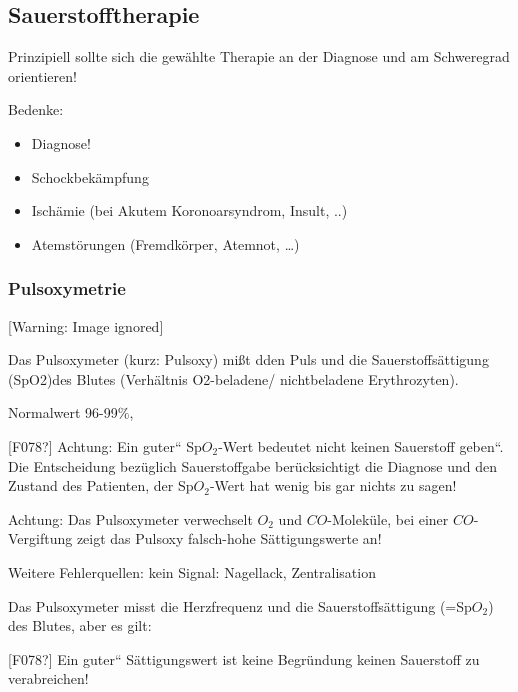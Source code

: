 \subsection{Sauerstofftherapie}
Prinzipiell sollte sich die gew\"ahlte Therapie an der Diagnose und am
Schweregrad orientieren!

Bedenke: 

\begin{itemize}
\item Diagnose!

\item Schockbek\"ampfung

\item Isch\"amie (bei Akutem Koronoarsyndrom, Insult, ..)

\item Atemst\"orungen (Fremdk\"orper, Atemnot, {\dots})

\end{itemize}

\subsubsection{Pulsoxymetrie}

\begin{center}
 [Warning: Image ignored] %

\end{center}
Das Pulsoxymeter (kurz: Pulsoxy) mi{\ss}t dden Puls und die
Sauerstoffs\"attigung (SpO2)des Blutes (Verh\"altnis
O2-beladene/ nichtbeladene Erythrozyten). 

Normalwert 96-99\%, 

[F078?] Achtung: Ein {\quotedblbase}guter{\textquotedblleft}
Sp$O_2$-Wert bedeutet nicht {\quotedblbase}keinen Sauerstoff
geben{\textquotedblleft}. Die Entscheidung bez\"uglich Sauerstoffgabe
ber\"ucksichtigt die Diagnose und den Zustand des Patienten, der
Sp$O_2$-Wert hat wenig bis gar nichts zu sagen! 

Achtung: Das Pulsoxymeter verwechselt $O_2$ und
$CO$-Molek\"ule, bei einer $CO$-Vergiftung zeigt das Pulsoxy
falsch-hohe S\"attigungswerte an!

Weitere Fehlerquellen: kein Signal: Nagellack, Zentralisation

Das Pulsoxymeter misst die Herzfrequenz und die Sauerstoffs\"attigung
(=Sp$O_2$) des Blutes, aber es gilt:

[F078?] Ein {\quotedblbase}guter{\textquotedblleft} S\"attigungswert ist
keine Begr\"undung keinen Sauerstoff zu verabreichen!
